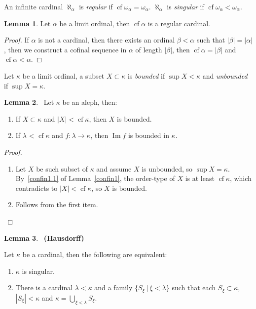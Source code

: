 \documentclass[8pt]{article}
\theoremstyle{definition}
\theoremstyle{definition}
\theoremstyle{definition}
\theoremstyle{definition}
\theoremstyle{definition}
\theoremstyle{definition}
\theoremstyle{definition}
\theoremstyle{definition}
\newtheorem{lemma}{Lemma}[section]
\theoremstyle{definition}
\theoremstyle{definition}
\theoremstyle{definition}
\theoremstyle{definition}
\theoremstyle{definition}
\theoremstyle{definition}
\theoremstyle{question}
\begin{document}
An infinite cardinal $\aleph_{\alpha}$ is \emph{regular} if $\operatorname{cf} \omega_{\alpha} = \omega_{\alpha}$.
$\aleph_{\alpha}$ is \emph{singular} if $\operatorname{cf} \omega_{\alpha} < \omega_{\alpha}$.

\begin{lemma}
  Let $\alpha$ be a limit ordinal, then $\operatorname{cf} \alpha$ is a regular cardinal.
\end{lemma}

\begin{proof}
  If $\alpha$ is not a cardinal, then there exists an ordinal $\beta < \alpha$ such that 
  $|\beta| = |\alpha|$, 
  then we construct a cofinal sequence in $\alpha$ of length $|\beta|$, then $\operatorname{cf} \alpha = |\beta|$ 
  and $\operatorname{cf} \alpha < \alpha$.
\end{proof}

Let $\kappa$ be a limit ordinal, a subset $X \subset \kappa$ is \emph{bounded} if $\sup X < \kappa$ and 
\emph{unbounded} if $\sup X = \kappa$.

\begin{lemma}~\label{boundedaleph} Let $\kappa$ be an aleph, then:

  \begin{enumerate}
    \item If $X \subset \kappa$ and $|X| < \operatorname{cf} \kappa$, then $X$ is bounded.
    \item If $\lambda$ < $\operatorname{cf} \kappa$ and $f : \lambda \to \kappa$, 
    then $\operatorname{Im}f$ is bounded in $\kappa$.
  \end{enumerate}
\end{lemma}

\begin{proof}

  \begin{enumerate}
    \item Let $X$ be such subset of $\kappa$ and assume $X$ is unbounded, so $\sup X = \kappa$.
    By~\ref{confin1.1} of Lemma~\ref{confin1}, the order-type of $X$ is at least $\operatorname{cf} \kappa$, which contradicts to 
    $|X| < \operatorname{cf} \kappa$, so $X$ is bounded.
    \item  Follows from the first item.
  \end{enumerate}
\end{proof}

\begin{lemma}~\label{reg} {\bf (Hausdorff)}

  Let $\kappa$ be a cardinal, then the following are equivalent:

  \begin{enumerate}
    \item $\kappa$ is singular.
    \item There is a cardinal $\lambda < \kappa$ and a family $\{ S_{\xi} \: | \: \xi < \lambda \}$ such that
    each $S_{\xi} \subset \kappa$, $|S_{\xi}| < \kappa$ and $\kappa = \bigcup \limits_{\xi < \lambda} S_{\xi}$.
  \end{enumerate}

\end{lemma}
\end{document}
